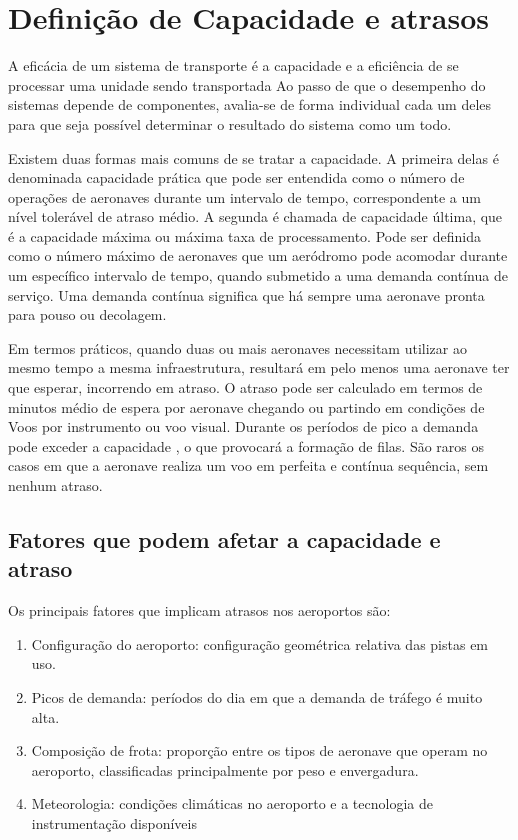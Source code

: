 \documentclass[12pt]{article}
\begin{document}
  \section{Definição de Capacidade e atrasos}
  
  A eficácia de um sistema de transporte é a capacidade e a eficiência de
  se processar uma unidade sendo transportada Ao passo de que o desempenho
  do sistemas depende de componentes, avalia-se de forma individual cada
  um deles para que seja possível determinar o resultado do sistema como 
  um todo. 
  
  Existem duas formas mais comuns de se tratar a capacidade. A primeira delas
  é denominada capacidade prática que pode ser entendida como o número de 
  operações de aeronaves durante um intervalo de tempo, correspondente a um
  nível tolerável de atraso médio. A segunda é chamada de capacidade última,
  que é a capacidade máxima ou máxima taxa de processamento. Pode ser 
  definida como o número máximo de aeronaves que um aeródromo pode acomodar
  durante um específico intervalo de tempo, quando submetido a uma demanda
  contínua de serviço. Uma demanda contínua significa que há sempre uma 
  aeronave pronta para pouso ou decolagem. 
  
  Em termos práticos, quando duas ou mais aeronaves necessitam utilizar ao
  mesmo tempo a mesma infraestrutura, resultará em pelo menos uma aeronave 
  ter que esperar, incorrendo em atraso. O atraso pode ser calculado em termos
  de minutos médio de espera por aeronave chegando ou partindo em condições 
  de Voos por instrumento ou voo visual. Durante os períodos de pico a demanda
  pode exceder a capacidade , o que provocará a formação de filas. São raros
  os casos em que a aeronave realiza um voo em perfeita e contínua sequência,
  sem nenhum atraso. 
  
  \subsection{Fatores que podem afetar a capacidade e atraso}
  
  Os principais fatores que implicam atrasos nos aeroportos são:
  
  
  \begin{enumerate}
    
    \item Configuração do aeroporto: configuração geométrica relativa das pistas 
      em uso.
  
    \item Picos de demanda: períodos do dia em que a demanda de tráfego é muito
      alta.
  
    \item Composição de frota: proporção entre os tipos de aeronave que operam no 
    aeroporto, classificadas principalmente por peso e envergadura.
  
    \item Meteorologia: condições climáticas no aeroporto e a tecnologia de 
    instrumentação disponíveis
  
  \end{enumerate}
  
\end{document}
